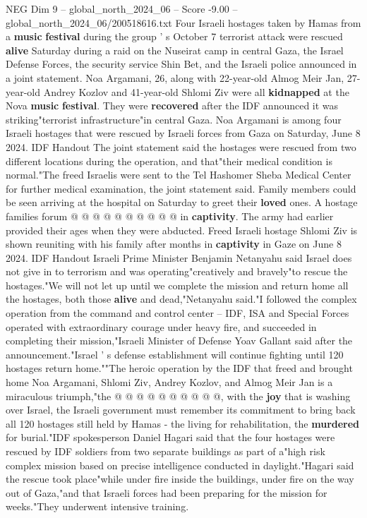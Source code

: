 \begin{textsample}{NEG Dim 9 – global\_north\_2024\_06 – Score -9.00 – global\_north\_2024\_06/200518616.txt}  \label{ex:f9_neg_162}
Four Israeli hostages taken by Hamas from a \textbf{music} \textbf{festival} during the group ' s October 7 terrorist attack were rescued \textbf{alive} Saturday during a raid on the Nuseirat camp in central Gaza, the Israel Defense Forces, the security service Shin Bet, and the Israeli police announced in a joint statement.
Noa Argamani, 26, along with 22-year-old Almog Meir Jan, 27-year-old Andrey Kozlov and 41-year-old Shlomi Ziv were all \textbf{kidnapped} at the Nova \textbf{music} \textbf{festival}.
They were \textbf{recovered} after the IDF announced it was striking"terrorist infrastructure"in central Gaza.
Noa Argamani is among four Israeli hostages that were rescued by Israeli forces from Gaza on Saturday, June 8 2024.
IDF Handout The joint statement said the hostages were rescued from two different locations during the operation, and that"their medical condition is normal."The freed Israelis were sent to the Tel Hashomer Sheba Medical Center for further medical examination, the joint statement said.
Family members could be seen arriving at the hospital on Saturday to greet their \textbf{loved} ones.
A hostage families forum @ @ @ @ @ @ @ @ @ @ in \textbf{captivity}.
The army had earlier provided their ages when they were abducted.
Freed Israeli hostage Shlomi Ziv is shown reuniting with his family after months in \textbf{captivity} in Gaze on June 8 2024.
IDF Handout Israeli Prime Minister Benjamin Netanyahu said Israel does not give in to terrorism and was operating"creatively and bravely"to rescue the hostages."We will not let up until we complete the mission and return home all the hostages, both those \textbf{alive} and dead,"Netanyahu said."I followed the complex operation from the command and control center -- IDF, ISA and Special Forces operated with extraordinary courage under heavy fire, and succeeded in completing their mission,"Israeli Minister of Defense Yoav Gallant said after the announcement."Israel ' s defense establishment will continue fighting until 120 hostages return home.""The heroic operation by the IDF that freed and brought home Noa Argamani, Shlomi Ziv, Andrey Kozlov, and Almog Meir Jan is a miraculous triumph,"the @ @ @ @ @ @ @ @ @ @, with the \textbf{joy} that is washing over Israel, the Israeli government must remember its commitment to bring back all 120 hostages still held by Hamas - the living for rehabilitation, the \textbf{murdered} for burial."IDF spokesperson Daniel Hagari said that the four hostages were rescued by IDF soldiers from two separate buildings as part of a"high risk complex mission based on precise intelligence conducted in daylight."Hagari said the rescue took place"while under fire inside the buildings, under fire on the way out of Gaza,"and that Israeli forces had been preparing for the mission for weeks."They underwent intensive training.

\end{textsample}
